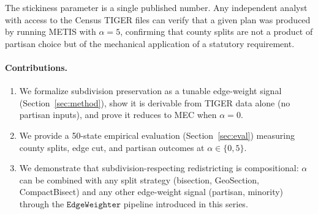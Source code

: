 The stickiness parameter is a single published number.
Any independent analyst with access to the Census TIGER files can verify that
a given plan was produced by running METIS with $\alpha = 5$, confirming that
county splits are not a product of partisan choice but of the mechanical
application of a statutory requirement.

\paragraph{Contributions.}
\begin{enumerate}
  \item We formalize subdivision preservation as a tunable edge-weight signal
    (Section~\ref{sec:method}), show it is derivable from TIGER data alone
    (no partisan inputs), and prove it reduces to MEC when $\alpha = 0$.
  \item We provide a 50-state empirical evaluation (Section~\ref{sec:eval})
    measuring county splits, edge cut, and partisan outcomes at $\alpha \in \{0, 5\}$.
  \item We demonstrate that subdivision-respecting redistricting is compositional:
    $\alpha$ can be combined with any split strategy (bisection, GeoSection,
    CompactBisect) and any other edge-weight signal (partisan, minority) through
    the $\mathtt{EdgeWeighter}$ pipeline introduced in this series.
\end{enumerate}

